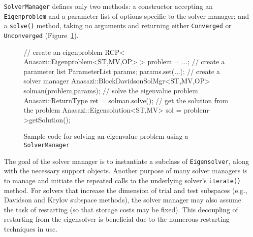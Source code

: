 \documentclass[acmtoms]{acmtrans2m}
\newcommand{\aspace}[1]{\texttt{#1}}
\begin{document}

\aspace{SolverManager} defines only two methods: a constructor
accepting an \aspace{Eigenproblem} and a parameter list of
options specific to the solver manager; and a \verb!solve()! method, taking no
arguments and returning either \aspace{Converged} or
\aspace{Unconverged} (Figure~\ref{fig:examplesolve}).

\begin{figure}[htb]
\begin{center}
\begin{boxedverbatim}
// create an eigenproblem
RCP< Anasazi::Eigenproblem<ST,MV,OP> > problem = ...;
// create a parameter list
ParameterList params;
params.set(...);
// create a solver manager
Anasazi::BlockDavidsonSolMgr<ST,MV,OP> solman(problem,params);
// solve the eigenvalue problem
Anasazi::ReturnType ret = solman.solve();
// get the solution from the problem
Anasazi::Eigensolution<ST,MV> sol = problem->getSolution();
\end{boxedverbatim}
\end{center}
\caption{Sample code for solving an eigenvalue problem using a \aspace{SolverManager}}
\label{fig:examplesolve}
\end{figure}

The goal of the solver manager is to instantiate a subclass of \aspace{Eigensolver}, along
with the necessary support objects. Another purpose of many solver managers is to manage
and initiate the repeated calls to the underlying solver's \verb!iterate()! method. For
solvers that increase the dimension of trial and test subspaces (e.g., Davidson and Krylov
subspace methods), the solver manager may also assume the task of restarting (so that
storage costs may be fixed). This decoupling of restarting from the eigensolver is
beneficial due to the numerous restarting techniques in use.

\end{document}
